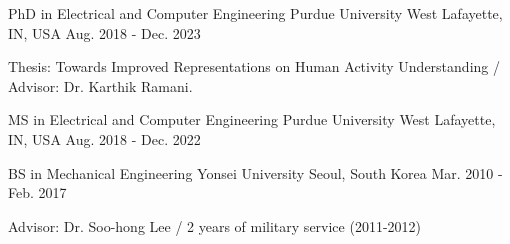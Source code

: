 


\begin{cventries}


    \cventry
    {PhD in Electrical and Computer Engineering} %
    {Purdue University} %
    {West Lafayette, IN, USA} %
    {Aug. 2018 - Dec. 2023} %
    { %
    \begin{cvitems}
        \item {Thesis: Towards Improved Representations on Human Activity Understanding / Advisor: Dr. Karthik Ramani.}
    \end{cvitems}
    }

    \cventry
    {MS in Electrical and Computer Engineering} %
    {Purdue University} %
    {West Lafayette, IN, USA} %
    {Aug. 2018 - Dec. 2022} %
    { %
    }
    \vspace{-1em}

    \cventry
    {BS in Mechanical Engineering} %
    {Yonsei University} %
    {Seoul, South Korea} %
    {Mar. 2010 - Feb. 2017} %
    { %
    \begin{cvitems}
        \item {Advisor: Dr. Soo-hong Lee / 2 years of military service (2011-2012)}
    \end{cvitems}
    }

\end{cventries}
